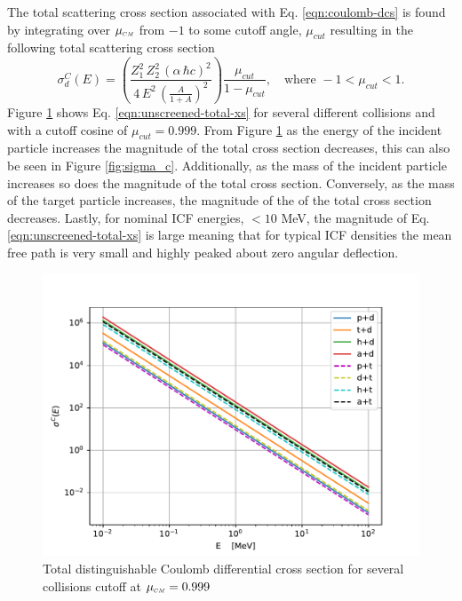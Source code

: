 The total scattering cross section associated with Eq. \eqref{eqn:coulomb-dcs} is found by integrating over $\mucm$ from $-1$ to some cutoff angle, $\mu_{cut}$ resulting in the following total scattering cross section
\begin{equation} \label{eqn:unscreened-total-xs}
    \sigma^C_d(E) = \left(\dfrac{Z_1^2 \, Z_2^2 \, \left(\alpha \, \hbar c\right)^2}{ 4 \, E^2 \, \left(\frac{A}{1 + A} \right)^2}\right) \dfrac{\mu_{cut}}{1-\mu_{cut}}, \quad \text{where} \,\, -1 < \mu_{cut} < 1.
\end{equation}
Figure \ref{fig:sigma_c_total} shows Eq. \eqref{eqn:unscreened-total-xs} for several different collisions and with a cutoff cosine of $\mu_{cut} = 0.999$. From Figure \ref{fig:sigma_c_total} as the energy of the incident particle increases the magnitude of the total cross section decreases, this can also be seen in Figure \ref{fig:sigma_c}. Additionally, as the mass of the incident particle increases so does the magnitude of the total cross section. Conversely, as the mass of the target particle increases, the magnitude of the of the total cross section decreases. Lastly, for nominal ICF energies, $<10$ MeV, the magnitude of Eq. \eqref{eqn:unscreened-total-xs} is large meaning that for typical ICF densities the mean free path is very small and highly peaked about zero angular deflection.
\begin{figure}[!htb]
    \centering
    \includegraphics[scale=0.75]{../figures/interaction_physics/total-sigma-C.pdf}
    \caption{Total distinguishable Coulomb differential cross section for several collisions cutoff at $\mucm = 0.999$}
    \label{fig:sigma_c_total}
\end{figure}

